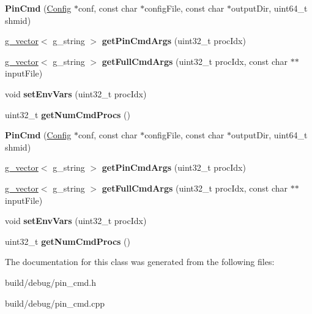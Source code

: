 \begin{DoxyCompactItemize}
\item 
\hypertarget{classPinCmd_a77710658061bc8e9e4def5205c1f2569}{{\bfseries Pin\-Cmd} (\hyperlink{classConfig}{Config} $\ast$conf, const char $\ast$config\-File, const char $\ast$output\-Dir, uint64\-\_\-t shmid)}\label{classPinCmd_a77710658061bc8e9e4def5205c1f2569}

\item 
\hypertarget{classPinCmd_a91248a568edb9c0083297441aeb5e8e3}{\hyperlink{classg__vector}{g\-\_\-vector}$<$ g\-\_\-string $>$ {\bfseries get\-Pin\-Cmd\-Args} (uint32\-\_\-t proc\-Idx)}\label{classPinCmd_a91248a568edb9c0083297441aeb5e8e3}

\item 
\hypertarget{classPinCmd_a483de8c3bd3b0c12ac290e207133bcd7}{\hyperlink{classg__vector}{g\-\_\-vector}$<$ g\-\_\-string $>$ {\bfseries get\-Full\-Cmd\-Args} (uint32\-\_\-t proc\-Idx, const char $\ast$$\ast$input\-File)}\label{classPinCmd_a483de8c3bd3b0c12ac290e207133bcd7}

\item 
\hypertarget{classPinCmd_ab030b2e5fd5b364de12e1ccc8430a417}{void {\bfseries set\-Env\-Vars} (uint32\-\_\-t proc\-Idx)}\label{classPinCmd_ab030b2e5fd5b364de12e1ccc8430a417}

\item 
\hypertarget{classPinCmd_a75428013a86959e36f6ea6b1918c5e40}{uint32\-\_\-t {\bfseries get\-Num\-Cmd\-Procs} ()}\label{classPinCmd_a75428013a86959e36f6ea6b1918c5e40}

\item 
\hypertarget{classPinCmd_a77710658061bc8e9e4def5205c1f2569}{{\bfseries Pin\-Cmd} (\hyperlink{classConfig}{Config} $\ast$conf, const char $\ast$config\-File, const char $\ast$output\-Dir, uint64\-\_\-t shmid)}\label{classPinCmd_a77710658061bc8e9e4def5205c1f2569}

\item 
\hypertarget{classPinCmd_ac0cfff0f8cf7c20e6d3339fb9cfbc827}{\hyperlink{classg__vector}{g\-\_\-vector}$<$ g\-\_\-string $>$ {\bfseries get\-Pin\-Cmd\-Args} (uint32\-\_\-t proc\-Idx)}\label{classPinCmd_ac0cfff0f8cf7c20e6d3339fb9cfbc827}

\item 
\hypertarget{classPinCmd_ac66a8a85dc46168ed6c9c1fecc994258}{\hyperlink{classg__vector}{g\-\_\-vector}$<$ g\-\_\-string $>$ {\bfseries get\-Full\-Cmd\-Args} (uint32\-\_\-t proc\-Idx, const char $\ast$$\ast$input\-File)}\label{classPinCmd_ac66a8a85dc46168ed6c9c1fecc994258}

\item 
\hypertarget{classPinCmd_ab030b2e5fd5b364de12e1ccc8430a417}{void {\bfseries set\-Env\-Vars} (uint32\-\_\-t proc\-Idx)}\label{classPinCmd_ab030b2e5fd5b364de12e1ccc8430a417}

\item 
\hypertarget{classPinCmd_a75428013a86959e36f6ea6b1918c5e40}{uint32\-\_\-t {\bfseries get\-Num\-Cmd\-Procs} ()}\label{classPinCmd_a75428013a86959e36f6ea6b1918c5e40}

\end{DoxyCompactItemize}


The documentation for this class was generated from the following files\-:\begin{DoxyCompactItemize}
\item 
build/debug/pin\-\_\-cmd.\-h\item 
build/debug/pin\-\_\-cmd.\-cpp\end{DoxyCompactItemize}
